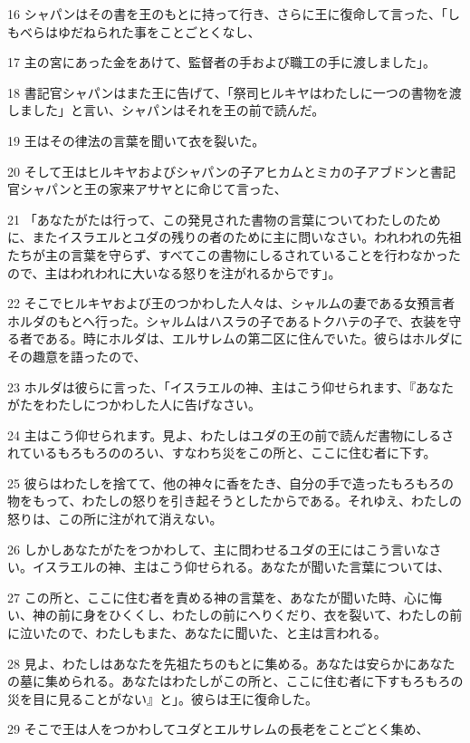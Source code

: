 \par 16 シャパンはその書を王のもとに持って行き、さらに王に復命して言った、「しもべらはゆだねられた事をことごとくなし、
\par 17 主の宮にあった金をあけて、監督者の手および職工の手に渡しました」。
\par 18 書記官シャパンはまた王に告げて、「祭司ヒルキヤはわたしに一つの書物を渡しました」と言い、シャパンはそれを王の前で読んだ。
\par 19 王はその律法の言葉を聞いて衣を裂いた。
\par 20 そして王はヒルキヤおよびシャパンの子アヒカムとミカの子アブドンと書記官シャパンと王の家来アサヤとに命じて言った、
\par 21 「あなたがたは行って、この発見された書物の言葉についてわたしのために、またイスラエルとユダの残りの者のために主に問いなさい。われわれの先祖たちが主の言葉を守らず、すべてこの書物にしるされていることを行わなかったので、主はわれわれに大いなる怒りを注がれるからです」。
\par 22 そこでヒルキヤおよび王のつかわした人々は、シャルムの妻である女預言者ホルダのもとへ行った。シャルムはハスラの子であるトクハテの子で、衣装を守る者である。時にホルダは、エルサレムの第二区に住んでいた。彼らはホルダにその趣意を語ったので、
\par 23 ホルダは彼らに言った、「イスラエルの神、主はこう仰せられます、『あなたがたをわたしにつかわした人に告げなさい。
\par 24 主はこう仰せられます。見よ、わたしはユダの王の前で読んだ書物にしるされているもろもろののろい、すなわち災をこの所と、ここに住む者に下す。
\par 25 彼らはわたしを捨てて、他の神々に香をたき、自分の手で造ったもろもろの物をもって、わたしの怒りを引き起そうとしたからである。それゆえ、わたしの怒りは、この所に注がれて消えない。
\par 26 しかしあなたがたをつかわして、主に問わせるユダの王にはこう言いなさい。イスラエルの神、主はこう仰せられる。あなたが聞いた言葉については、
\par 27 この所と、ここに住む者を責める神の言葉を、あなたが聞いた時、心に悔い、神の前に身をひくくし、わたしの前にへりくだり、衣を裂いて、わたしの前に泣いたので、わたしもまた、あなたに聞いた、と主は言われる。
\par 28 見よ、わたしはあなたを先祖たちのもとに集める。あなたは安らかにあなたの墓に集められる。あなたはわたしがこの所と、ここに住む者に下すもろもろの災を目に見ることがない』と」。彼らは王に復命した。
\par 29 そこで王は人をつかわしてユダとエルサレムの長老をことごとく集め、
